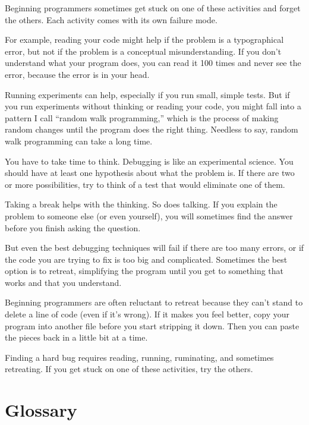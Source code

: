Beginning programmers sometimes get stuck on one of these activities
and forget the others.  Each activity comes with its own failure
mode.


For example, reading your code might help if the problem is a
typographical error, but not if the problem is a conceptual
misunderstanding.  If you don't understand what your program does, you
can read it 100 times and never see the error, because the error is in
your head.


Running experiments can help, especially if you run small, simple
tests.  But if you run experiments without thinking or reading your
code, you might fall into a pattern I call ``random walk programming,''
which is the process of making random changes until the program
does the right thing.  Needless to say, random walk programming
can take a long time.


You have to take time to think.  Debugging is like an
experimental science.  You should have at least one hypothesis about
what the problem is.  If there are two or more possibilities, try to
think of a test that would eliminate one of them.

Taking a break helps with the thinking.  So does talking.
If you explain the problem to someone else (or even yourself), you
will sometimes find the answer before you finish asking the question.

But even the best debugging techniques will fail if there are too many
errors, or if the code you are trying to fix is too big and
complicated.  Sometimes the best option is to retreat, simplifying the
program until you get to something that works and that you
understand.

Beginning programmers are often reluctant to retreat because
they can't stand to delete a line of code (even if it's wrong).
If it makes you feel better, copy your program into another file
before you start stripping it down.  Then you can paste the pieces
back in a little bit at a time.

Finding a hard bug requires reading, running, ruminating, and
sometimes retreating.  If you get stuck on one of these activities,
try the others.


\section{Glossary}

